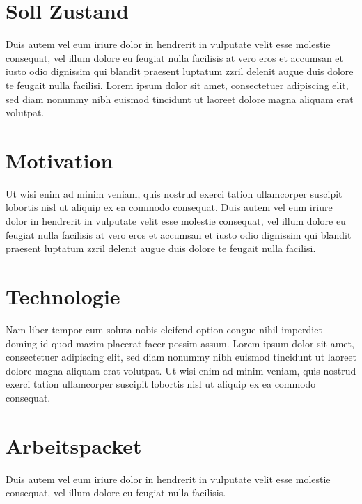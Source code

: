 \documentclass[
a4paper, 			%
12pt,					%
headsepline,	%
ngerman,			%
]{scrartcl} %
\begin{document}
	\newpage
	\section{Soll Zustand}
	Duis autem vel eum iriure dolor in hendrerit in vulputate velit esse molestie consequat, vel illum dolore eu feugiat nulla facilisis at vero eros et accumsan et iusto odio dignissim qui blandit praesent luptatum zzril delenit augue duis dolore te feugait nulla facilisi. Lorem ipsum dolor sit amet, consectetuer adipiscing elit, sed diam nonummy nibh euismod tincidunt ut laoreet dolore magna aliquam erat volutpat.
	
	\newpage
	\section{Motivation}
	Ut wisi enim ad minim veniam, quis nostrud exerci tation ullamcorper suscipit lobortis nisl ut aliquip ex ea commodo consequat. Duis autem vel eum iriure dolor in hendrerit in vulputate velit esse molestie consequat, vel illum dolore eu feugiat nulla facilisis at vero eros et accumsan et iusto odio dignissim qui blandit praesent luptatum zzril delenit augue duis dolore te feugait nulla facilisi.
	
	\newpage
	\section{Technologie}
	Nam liber tempor cum soluta nobis eleifend option congue nihil imperdiet doming id quod mazim placerat facer possim assum. Lorem ipsum dolor sit amet, consectetuer adipiscing elit, sed diam nonummy nibh euismod tincidunt ut laoreet dolore magna aliquam erat volutpat. Ut wisi enim ad minim veniam, quis nostrud exerci tation ullamcorper suscipit lobortis nisl ut aliquip ex ea commodo consequat.
	
	\newpage
	\section{Arbeitspacket}
	Duis autem vel eum iriure dolor in hendrerit in vulputate velit esse molestie consequat, vel illum dolore eu feugiat nulla facilisis.
\end{document}
